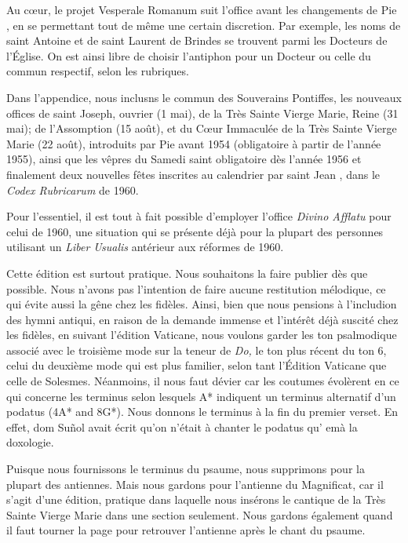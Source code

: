 \begin{frpars}

Au cœur, le projet Vesperale Romanum suit l'office avant les changements de Pie , en se permettant tout de même une certain discretion. Par exemple, les noms de saint Antoine et de saint Laurent de Brindes se trouvent parmi les Docteurs de l'Église. On est ainsi libre de choisir l'antiphon pour un Docteur ou celle du commun respectif, selon les rubriques.

Dans l'appendice, nous inclusns le commun des Souverains Pontiffes, les nouveaux offices de saint Joseph, ouvrier (1 mai), de la Très Sainte Vierge Marie, Reine (31 mai); de l'Assomption (15 août), et du Cœur Immaculée de la Très Sainte Vierge Marie (22 août), introduits par Pie  avant 1954 (obligatoire à partir de l'année 1955), ainsi que les vêpres du Samedi saint obligatoire dès l'année 1956 et finalement deux nouvelles fêtes inscrites au calendrier par saint Jean , dans le \textit{Codex Rubricarum} de 1960.

Pour l'essentiel, il est tout à fait possible d'employer l'office \textit{Divino Afflatu} pour celui de 1960, une situation qui se présente déjà pour la plupart des personnes utilisant un \textit{Liber Usualis} antérieur aux réformes de 1960.

Cette édition est surtout pratique. Nous souhaitons la faire publier dès que possible. Nous n'avons pas l'intention de faire aucune restitution mélodique, ce qui évite aussi la gêne chez les fidèles. Ainsi, bien que nous pensions à l'includion des hymni antiqui, en raison de la demande immense et l'intérêt déjà suscité chez les fidèles, en suivant l'édition Vaticane, nous voulons garder les ton psalmodique associé avec le troisième mode sur la teneur de \textit{Do,} le ton plus récent du ton 6, celui du deuxième mode qui est plus familier, selon tant l'Édition Vaticane que celle de Solesmes. Néanmoins, il nous faut dévier car les coutumes évolèrent en ce qui concerne les terminus selon lesquels A* indiquent un terminus alternatif d'un podatus  (4A* and 8G*). Nous donnons le terminus à la fin du premier verset. En effet, dom Suñol avait écrit qu'on n'était à chanter le podatus qu' emà la doxologie.

Puisque nous fournissons le terminus du psaume, nous supprimons  pour la plupart des antiennes. Mais nous gardons  pour l'antienne du Magnificat, car il s'agit d'une édition, pratique dans laquelle nous insérons le cantique de la Très Sainte Vierge Marie dans une section seulement. Nous gardons également  quand il faut tourner la page pour retrouver l'antienne après le chant du psaume.


\end{frpars}
